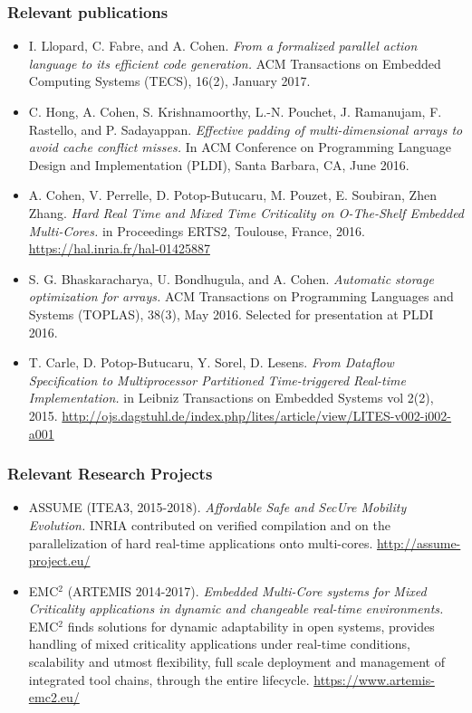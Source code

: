 \documentclass[a4paper,11pt]{article}
\begin{document}
\pagebreak
\subsubsection*{Relevant publications}
\begin{itemize}
\item I. Llopard, C. Fabre, and A. Cohen. \textit{From a formalized parallel action language to its efficient code generation.}
ACM Transactions on Embedded Computing Systems (TECS), 16(2), January 2017.
\item C. Hong, A. Cohen, S. Krishnamoorthy, L.-N. Pouchet, J. Ramanujam, F. Rastello, and P. Sadayappan. \textit{Effective
padding of multi-dimensional arrays to avoid cache conflict misses.} In ACM Conference on Programming
Language Design and Implementation (PLDI), Santa Barbara, CA, June 2016.
\item A. Cohen, V. Perrelle, D. Potop-Butucaru, M. Pouzet, E. Soubiran, Zhen Zhang. \textit{Hard Real Time and Mixed
Time Criticality on O-The-Shelf Embedded Multi-Cores.} in Proceedings ERTS2, Toulouse, France, 2016.
\url{https://hal.inria.fr/hal-01425887}
\item S. G. Bhaskaracharya, U. Bondhugula, and A. Cohen. \textit{Automatic storage optimization for arrays.} ACM Transactions
on Programming Languages and Systems (TOPLAS), 38(3), May 2016. Selected for presentation at PLDI 2016.
\item T. Carle, D. Potop-Butucaru, Y. Sorel, D. Lesens. \textit{From Dataflow Specification to Multiprocessor Partitioned
Time-triggered Real-time Implementation.} in Leibniz Transactions on Embedded Systems vol 2(2), 2015.
\url{http://ojs.dagstuhl.de/index.php/lites/article/view/LITES-v002-i002-a001}
\end{itemize}

\subsubsection*{Relevant Research Projects}
\begin{itemize}
\item ASSUME (ITEA3, 2015-2018). \textit{Affordable Safe and SecUre Mobility Evolution.} INRIA contributed on verified compilation and on the parallelization of hard real-time applications onto multi-cores. \url{http://assume-project.eu/}
\item EMC$^2$ (ARTEMIS	2014-2017). \textit{Embedded Multi-Core systems for Mixed Criticality applications in dynamic and changeable real-time environments.} EMC$^2$ finds solutions for dynamic adaptability in open systems, provides handling of mixed criticality applications under real-time conditions, scalability and utmost flexibility, full scale deployment and management of integrated tool chains, through the entire lifecycle.	\url{https://www.artemis-emc2.eu/} \end{itemize}
\end{document}
